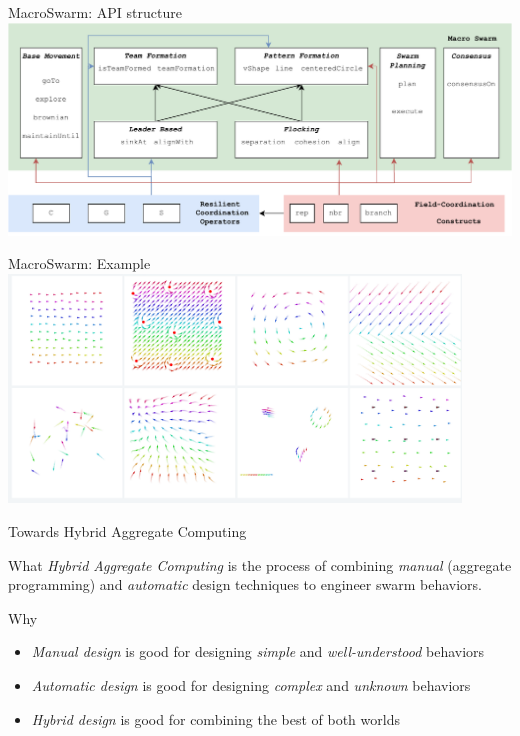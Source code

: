 \documentclass[presentation, 9pt]{beamer}\mode<presentation>{\usetheme{AMSBolognaFC}}
\begin{document}
\begin{frame}{MacroSwarm: API structure}
	\centering
	\includegraphics[width=\textwidth]{img/api-structure.drawio.pdf}
\end{frame}
\begin{frame}{MacroSwarm: Example}
	\centering
	\includegraphics[width=0.9\textwidth]{img/macro-swarm.png}
\end{frame}

\begin{frame}{Towards Hybrid Aggregate Computing}
	\begin{alertblock}{What}
		\emph{Hybrid Aggregate Computing} is the process of combining \emph{manual} (aggregate programming) and \emph{automatic} design techniques to engineer swarm behaviors.
	\end{alertblock}
	\begin{exampleblock}{Why}
		\begin{itemize}
			\item \emph{Manual design} is good for designing \emph{simple} and \emph{well-understood} behaviors
			\item \emph{Automatic design} is good for designing \emph{complex} and \emph{unknown} behaviors
			\item \emph{Hybrid design} is good for combining the best of both worlds
		\end{itemize}
	\end{exampleblock}
\end{frame}
\end{document}
